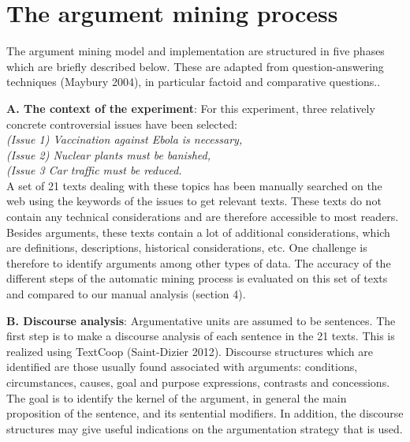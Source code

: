 \documentclass[11pt,letterpaper]{article}
\begin{document}
\section{The argument mining process}

The argument mining model and implementation are structured in five phases which are briefly  described below.
These are  adapted from question-answering techniques (Maybury 2004), in particular factoid and comparative questions..

{\bf A. The context of the experiment}:
For this experiment, three relatively concrete controversial issues have been selected:\\
{\it (Issue 1) Vaccination against Ebola is necessary,\\
(Issue 2) Nuclear plants must be banished,\\
(Issue 3 Car traffic must be reduced.}\\
A set of 21 texts dealing with these topics has been manually searched  on the web using the keywords of the issues to get relevant texts.  
These texts do not contain any technical considerations and are therefore accessible to most readers. 
Besides arguments, these texts contain  a lot of additional considerations, which are definitions, descriptions, historical considerations, etc. One challenge is therefore to identify arguments among other types of data.
The accuracy of the different steps of the automatic mining process is evaluated on this set of texts and compared to our manual analysis (section 4).

{\bf B. Discourse analysis}: Argumentative units are assumed to be sentences. The first step is to make a discourse analysis of each sentence in the 21 texts. This is realized using TextCoop (Saint-Dizier 2012). 
Discourse structures which are identified are those usually found associated with arguments: conditions, circumstances, causes, goal and purpose expressions, contrasts and concessions.
The goal  is to identify the kernel of the argument, in general the main proposition of the sentence, and its sentential modifiers. 
In addition, the discourse structures  may give useful indications on the argumentation strategy that is used.
\end{document}
